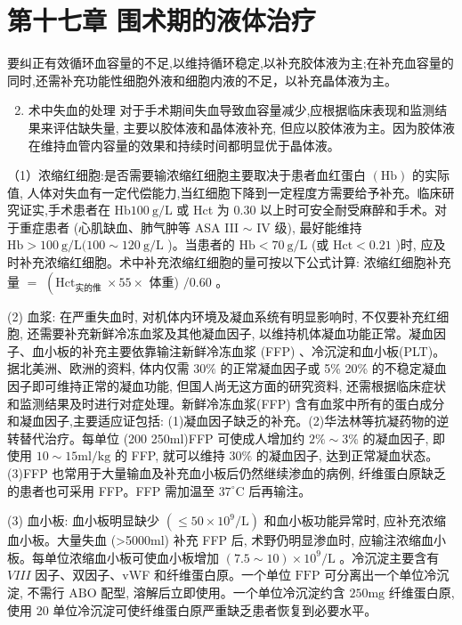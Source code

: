 \documentclass[10pt]{article}
\begin{document}
\section*{第十七章 围术期的液体治疗}
要纠正有效循环血容量的不足,以维持循环稳定,以补充胶体液为主;在补充血容量的同时,还需补充功能性细胞外液和细胞内液的不足，以补充晶体液为主。

\begin{enumerate}
  \setcounter{enumi}{1}
  \item 术中失血的处理 对于手术期间失血导致血容量减少,应根据临床表现和监测结果来评估缺失量, 主要以胶体液和晶体液补充, 但应以胶体液为主。因为胶体液在维持血管内容量的效果和持续时间都明显优于晶体液。
\end{enumerate}

（1）浓缩红细胞:是否需要输浓缩红细胞主要取决于患者血红蛋白 $(\mathrm{Hb})$ 的实际值, 人体对失血有一定代偿能力,当红细胞下降到一定程度方需要给予补充。临床研究证实,手术患者在 $\mathrm{Hb} 100 \mathrm{~g} / \mathrm{L}$ 或 Hct 为 0.30 以上时可安全耐受麻醉和手术。对于重症患者 (心肌缺血、肺气肿等 ASA III $\sim$ IV 级), 最好能维持 $\mathrm{Hb}>100 \mathrm{~g} / \mathrm{L}(100 \sim 120 \mathrm{~g} / \mathrm{L}$ )。当患者的 $\mathrm{Hb}<70 \mathrm{~g} / \mathrm{L}$ (或 $\mathrm{Hct}<0.21$ )时, 应及时补充浓缩红细胞。术中补充浓缩红细胞的量可按以下公式计算: 浓缩红细胞补充量 $=$ $\left(\mathrm{Hct}_{\text {实的倠 }} \times 55 \times\right.$ 体重) $/ 0.60$ 。

(2) 血浆: 在严重失血时, 对机体内环境及凝血系统有明显影响时, 不仅要补充红细胞, 还需要补充新鲜冷冻血浆及其他凝血因子, 以维持机体凝血功能正常。凝血因子、血小板的补充主要依靠输注新鲜冷冻血浆 (FFP) 、冷沉淀和血小板(PLT)。据北美洲、欧洲的资料, 体内仅需 $30 \%$ 的正常凝血因子或 5\% 20\% 的不稳定凝血因子即可维持正常的凝血功能, 但国人尚无这方面的研究资料, 还需根据临床症状和监测结果及时进行对症处理。新鲜冷冻血浆(FFP) 含有血浆中所有的蛋白成分和凝血因子,主要适应证包括: (1)凝血因子缺乏的补充。(2)华法林等抗凝药物的逆转替代治疗。每单位 (200 250ml)FFP 可使成人增加约 $2 \% \sim 3 \%$ 的凝血因子, 即使用 $10 \sim 15 \mathrm{ml} / \mathrm{kg}$ 的 FFP, 就可以维持 $30 \%$ 的凝血因子, 达到正常凝血状态。(3)FFP 也常用于大量输血及补充血小板后仍然继续渗血的病例, 纤维蛋白原缺乏的患者也可采用 FFP。FFP 需加温至 $37^{\circ} \mathrm{C}$ 后再输注。

(3) 血小板: 血小板明显缺少 $\left(\leqslant 50 \times 10^{9} / \mathrm{L}\right)$ 和血小板功能异常时, 应补充浓缩血小板。大量失血 (>5000ml) 补充 FFP 后, 术野仍明显渗血时, 应输注浓缩血小板。每单位浓缩血小板可使血小板增加 $(7.5 \sim 10) \times 10^{9} / \mathrm{L}$ 。冷沉淀主要含有 $V I I I$ 因子、双因子、vWF 和纤维蛋白原。一个单位 $\mathrm{FFP}$ 可分离出一个单位冷沉淀, 不需行 $\mathrm{ABO}$ 配型, 溶解后立即使用。一个单位冷沉淀约含 $250 \mathrm{mg}$ 纤维蛋白原, 使用 20 单位冷沉淀可使纤维蛋白原严重缺乏患者恢复到必要水平。
\end{document}

